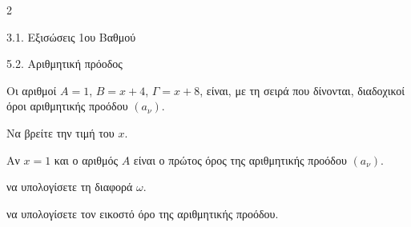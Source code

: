 \begin{ylh}{2}
    \item 3.1. Εξισώσεις 1ου Βαθμού
    \item 5.2. Αριθμητική πρόοδος
\end{ylh}
Οι αριθμοί ${A} = 1$, ${B} = x + 4$, $\varGamma = x + 8$, είναι, με τη σειρά που δίνονται, διαδοχικοί όροι αριθμητικής προόδου $(a_\nu)$.

\begin{alist}
\item Να βρείτε την τιμή του $x$.
\item Αν $x = 1$ και ο αριθμός ${A}$ είναι ο πρώτος όρος της αριθμητικής προόδου $(a_\nu)$.

\begin{rlist}
\item να υπολογίσετε τη διαφορά $\omega$.
\item να υπολογίσετε τον εικοστό όρο της αριθμητικής προόδου.
\end{rlist}
\end{alist}

